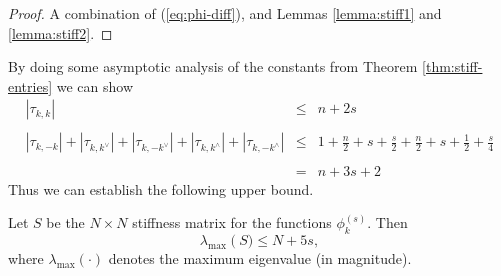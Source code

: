 \begin{proof}
  A combination of (\ref{eq:phi-diff}), and Lemmas \ref{lemma:stiff1}
  and \ref{lemma:stiff2}.
\end{proof}



By doing some asymptotic analysis of the constants from Theorem
\ref{thm:stiff-entries} we can show
\[ \begin{array}{lll}
     | \tau_{k, k} | & \leq & n + 2 s\\
     &  & \\
     | \tau_{k, - k} | + | \tau_{k, k^{\vee}} | + | \tau_{k, - k^{\vee}} | + |
     \tau_{k, k^{\wedge}} | + | \tau_{k, - k^{\wedge}} | & \leq & 1 +
     \frac{n}{2} + s + \frac{s}{2} + \frac{n}{2} + s + \frac{1}{2} +
     \frac{s}{4}\\
     &  & \\
     & = & n + 3 s + 2
   \end{array} \]
Thus we can establish the following upper bound.

\begin{theorem}
  Let $S$ be the $N \times N$ stiffness matrix for the functions
  $\phi_k^{(s)}$. Then
  \[ \lambda_{\max} \left( S) \leq N + 5 s, \right. \]
  where $\lambda_{\max} \left( \cdot \right)$ denotes the maximum eigenvalue
  (in magnitude).
\end{theorem}
